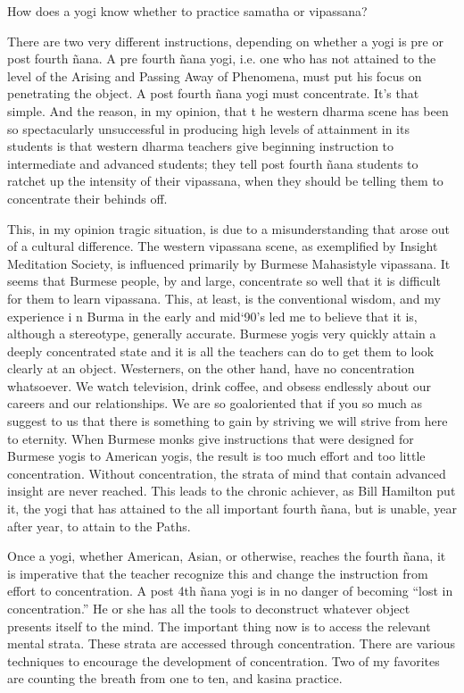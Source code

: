 \documentclass[a5paper,10pt,english]{book}
\begin{document}
\sphinxAtStartPar
How does a yogi know whether to practice samatha or vipassana?

\sphinxAtStartPar
There are two very different instructions, depending on whether a yogi
is pre\sphinxhyphen{} or post\sphinxhyphen{} fourth ñana. A pre\sphinxhyphen{} fourth ñana yogi, i.e. one who has
not attained to the level of the Arising and Passing Away of Phenomena,
must put his focus on penetrating the object. A post\sphinxhyphen{} fourth ñana yogi
must concentrate. It’s that simple. And the reason, in my opinion, that t
he western dharma scene has been so spectacularly unsuccessful in
producing high levels of attainment in its students is that western
dharma teachers give beginning instruction to intermediate and advanced
students; they tell post\sphinxhyphen{} fourth ñana students to ratchet up the
intensity of their vipassana, when they should be telling them to
concentrate their behinds off.

\sphinxAtStartPar
This, in my opinion tragic situation, is due to a misunderstanding that
arose out of a cultural difference. The western vipassana scene, as
exemplified by Insight Meditation Society, is influenced primarily by
Burmese Mahasi\sphinxhyphen{}style vipassana. It seems that Burmese people, by and
large, concentrate so well that it is difficult for them to learn
vipassana. This, at least, is the conventional wisdom, and my experience i
n Burma in the early and mid\sphinxhyphen{}‘90’s led me to believe that it is,
although a stereotype, generally accurate. Burmese yogis very quickly
attain a deeply concentrated state and it is all the teachers can do to
get them to look clearly at an object. Westerners, on the other hand,
have no concentration whatsoever. We watch television, drink coffee, and
obsess endlessly about our careers and our relationships. We are so
goal\sphinxhyphen{}oriented that if you so much as suggest to us that there is
something to gain by striving we will strive from here to eternity. When
Burmese monks give instructions that were designed for Burmese yogis to
American yogis, the result is too much effort and too little
concentration. Without concentration, the strata of mind that contain
advanced insight are never reached. This leads to the chronic achiever,
as Bill Hamilton put it, the yogi that has attained to the all important
fourth ñana, but is unable, year after year, to attain to the Paths.

\sphinxAtStartPar
Once a yogi, whether American, Asian, or otherwise, reaches the fourth
ñana, it is imperative that the teacher recognize this and change the
instruction from effort to concentration. A post 4th ñana yogi is in no
danger of becoming “lost in concentration.” He or she has all the tools
to deconstruct whatever object presents itself to the mind. The
important thing now is to access the relevant mental strata. These
strata are accessed through concentration. There are various techniques
to encourage the development of concentration. Two of my favorites are
counting the breath from one to ten, and kasina practice.
\end{document}
